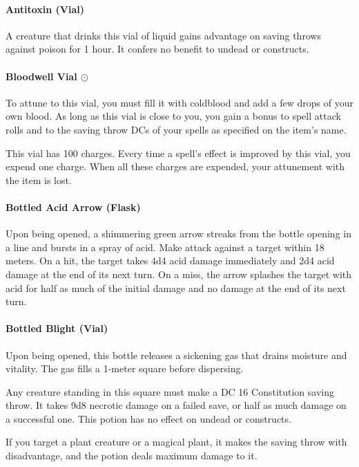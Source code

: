     \paragraph{Antitoxin (Vial)}
        A creature that drinks this vial of liquid gains advantage on saving throws against poison for 1 hour.
        It confers no benefit to undead or constructs.
    \paragraph{Bloodwell Vial $\odot$}
        To attune to this vial, you must fill it with coldblood and add a few drops of your own blood.
        As long as this vial is close to you, you gain a bonus to spell attack rolls and to the saving throw DCs of your spells as specified on the item's name.

        This vial has 100 charges.
        Every time a spell's effect is improved by this vial, you expend one charge.
        When all these charges are expended, your attunement with the item is lost.
    \paragraph{Bottled Acid Arrow (Flask)} %
        Upon being opened, a shimmering green arrow streaks from the bottle opening in a line and bursts in a spray of acid.
        Make attack against a target within 18 meters.
        On a hit, the target takes 4d4 acid damage immediately and 2d4 acid damage at the end of its next turn.
        On a miss, the arrow splashes the target with acid for half as much of the initial damage and no damage at the end of its next turn.
    \paragraph{Bottled Blight (Vial)} %
        Upon being opened, this bottle releases a sickening gas that drains moisture and vitality.
        The gas fills a 1-meter square before dispersing.

        Any creature standing in this square must make a DC 16 Constitution saving throw.
        It takes 9d8 necrotic damage on a failed save, or half as much damage on a successful one.
        This potion has no effect on undead or constructs.

        If you target a plant creature or a magical plant, it makes the saving throw with disadvantage, and the potion deals maximum damage to it.

